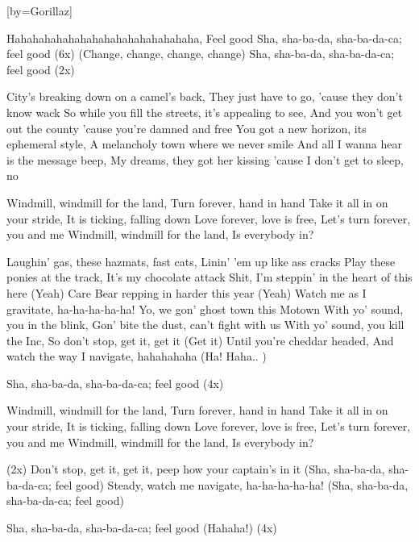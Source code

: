 

[by=Gorillaz]




\beginverse
Hahahahahahahahahahahahahahahaha, Feel good
Sha, sha-ba-da, sha-ba-da-ca; feel good   (6x)
(Change, change, change, change) Sha, sha-ba-da, sha-ba-da-ca; feel good   (2x)
\endverse

\beginverse
City's breaking down on a camel's back, They just have to go, 'cause they don't know wack
So while you fill the streets, it's appealing to see, And you won't get out the county 'cause you're damned and free
You got a new horizon, its ephemeral style, A melancholy town where we never smile
And all I wanna hear is the message beep, My dreams, they got her kissing 'cause I don't get to sleep, no
\endverse

\beginchorus
Windmill, windmill for the land, Turn forever, hand in hand
Take it all in on your stride, It is ticking, falling down
Love forever, love is free, Let's turn forever, you and me
Windmill, windmill for the land, Is everybody in?
\endchorus

\beginverse
Laughin' gas, these hazmats, fast cats, Linin' 'em up like ass cracks
Play these ponies at the track, It's my chocolate attack
Shit, I'm steppin' in the heart of this here (Yeah)
Care Bear repping in harder this year (Yeah)
Watch me as I gravitate, ha-ha-ha-ha-ha!  Yo, we gon' ghost town this Motown
With yo' sound, you in the blink, Gon' bite the dust, can't fight with us
With yo' sound, you kill the Inc, So don't stop, get it, get it (Get it)
Until you're cheddar headed, And watch the way I navigate, hahahahaha (Ha! Haha.. )
\endverse

\beginverse
Sha, sha-ba-da, sha-ba-da-ca; feel good   (4x)
\endverse

\beginchorus
Windmill, windmill for the land, Turn forever, hand in hand
Take it all in on your stride, It is ticking, falling down
Love forever, love is free, Let's turn forever, you and me
Windmill, windmill for the land, Is everybody in?
\endchorus

\beginverse
(2x)
Don't stop, get it, get it, peep how your captain's in it
(Sha, sha-ba-da, sha-ba-da-ca; feel good)
Steady, watch me navigate, ha-ha-ha-ha-ha!
(Sha, sha-ba-da, sha-ba-da-ca; feel good)
\endverse

\beginverse
Sha, sha-ba-da, sha-ba-da-ca; feel good (Hahaha!)  (4x)
\endverse


\endsong
